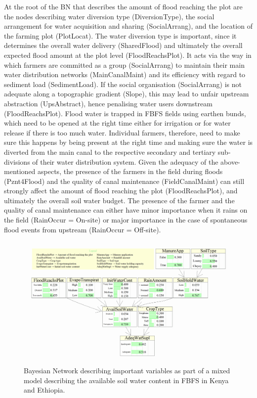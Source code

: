 \documentclass[]{elsarticle} %
\begin{document}
At the root of the BN that describes the amount of flood reaching the plot are the nodes describing water diversion type (DiversionType), the social arrangement for water acquisition and sharing (SocialArrang), and the location of the farming plot (PlotLocat). The water diversion type is important, since it determines the overall water delivery (SharedFlood) and ultimately the overall expected flood amount at the plot level (FloodReachsPlot). It acts via the way in which farmers are committed as a group (SocialArrang) to maintain their main water distribution networks (MainCanalMaint) and its efficiency with regard to sediment load (SedimentLoad). If the social organisation (SocialArrang) is not adequate along a topographic gradient (Slope), this may lead to unfair upstream abstraction (UpsAbstract), hence penalising water users downstream (FloodReachsPlot). Flood water is trapped in FBFS fields using earthen bunds, which need to be opened at the right time either for irrigation or for water release if there is too much water. Individual farmers, therefore, need to make sure this happens by being present at the right time and making sure the water is diverted from the main canal to the respective secondary and tertiary sub-divisions of their water distribution system. Given the adequacy of the above-mentioned aspects, the presence of the farmers in the field during floods (Pznt4Flood) and the quality of canal maintenance (FieldCanalMaint) can still strongly affect the amount of flood reaching the plot (FloodReachsPlot), and ultimately the overall soil water budget. The presence of the farmer and the quality of canal maintenance can either have minor importance when it rains on the field (RainOccur = On-site) or major importance in the case of spontaneous flood events from upstream (RainOccur = Off-site).

\begin{figure}[!h]

{\centering \includegraphics[width=1\linewidth,]{figures/Modelling_FBFS_Suppl_Water_Supply_Adequacy_BNs_plot} 

}

\caption{Bayesian Network describing important variables as part of a mixed model describing the available soil water content in FBFS in Kenya and Ethiopia.}\label{fig:fig3}
\end{figure}
\end{document}
